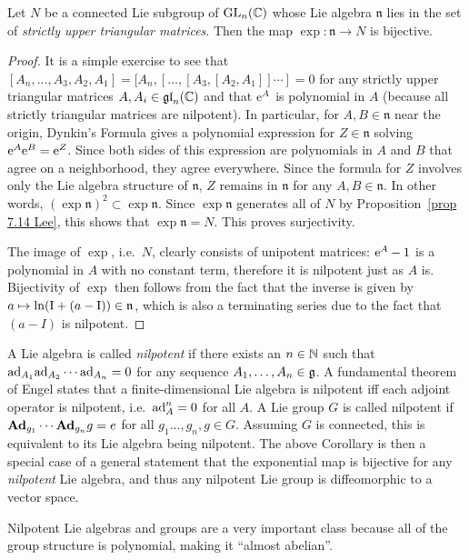 \begin{cor}\label{cor 5.16 Sepanski}
    Let $N$ be a connected Lie subgroup of $\operatorname{GL}_n(\mathbb{C})$ whose Lie algebra $\mathfrak{n}$ lies in the set of \emph{strictly upper triangular matrices}. Then the map $\exp:\mathfrak{n}\to N$ is bijective. 
\end{cor}
\begin{proof}
    It is a simple exercise to see that $[A_n,\ldots,A_3,A_2,A_1]=[A_n,[\ldots,[A_3,[A_2,A_1]]\cdots ]=0$ for any strictly upper triangular matrices $A,A_i\in \mathfrak{gl}_n(\mathbb{C})$ and that $\mathrm{e}^A$ is polynomial in $A$ (because all strictly triangular matrices are nilpotent). In particular, for $A,B\in\mathfrak{n}$ near the origin, Dynkin's Formula gives a polynomial expression for $Z\in\mathfrak{n}$ solving $\mathrm{e}^A\mathrm{e}^B=\mathrm{e}^Z$. Since both sides of this expression are polynomials in $A$ and $B$ that agree on a neighborhood, they agree everywhere. Since the formula for $Z$ involves only the Lie algebra structure of $\mathfrak{n}$, $Z$ remains in $\mathfrak{n}$ for any $A,B\in\mathfrak{n}$. In other words, $(\exp\mathfrak{n})^2\subset \exp\mathfrak{n}$. Since $\exp\mathfrak{n}$ generates all of $N$ by Proposition~\ref{prop 7.14 Lee}, this shows that $\exp\mathfrak{n}=N$. This proves surjectivity.

    The image of $\exp$, i.e.~$N$, clearly consists of unipotent matrices: $\mathrm{e}^A-1$ is a polynomial in $A$ with no constant term, therefore it is nilpotent just as $A$ is. Bijectivity of $\exp$ then follows from the fact that the inverse is given by $a\mapsto \ln (\mathrm{I}+(a-\mathrm{I}))\in\mathfrak{n}$, which is also a terminating series due to the fact that $(a-I)$ is nilpotent.
\end{proof}

\begin{rem}
    A Lie algebra is called \emph{nilpotent} if there exists an $n\in\mathbb{N}$ such that $\mathrm{ad}_{A_1}\mathrm{ad}_{A_2}\cdots \mathrm{ad}_{A_n}=0$ for any sequence $A_1,\ldots,A_n\in\mathfrak{g}$. A fundamental theorem of Engel states that a finite-dimensional Lie algebra is nilpotent iff each adjoint operator is nilpotent, i.e.~$\mathrm{ad}_A^n=0$ for all $A$. A Lie group $G$ is called nilpotent if $\mathrm{\mathbf{Ad}}_{g_1}\cdots \mathrm{\mathbf{Ad}}_{g_n}g=e$ for all $g_1\ldots,g_n,g\in G$. Assuming $G$  is connected, this is equivalent to its Lie algebra being nilpotent. The above Corollary is then a special case of a general statement that the exponential map is bijective for any \emph{nilpotent} Lie algebra, and thus any nilpotent Lie group is diffeomorphic to a vector space.

    Nilpotent Lie algebras and groups are a very important class because all of the group structure is polynomial, making it ``almost abelian''.
\end{rem}





